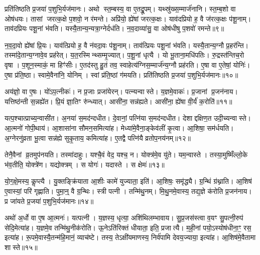 प्रति॑तिष्ठति प्र॒जया॑ प॒शुभि॒र्यज॑मानः।
अथो स्त॒म्बस्य॒ वा ए॒तद्रू॒पम्।
यथ्स्रु॑ख्स॒म्मार्ज॑नानि।
स्त॒म्ब॒शो वा ओष॑धयः।
तासां जरत्क॒क्षे प॒शवो॒ न र॑मन्ते।
अप्रि॑यो॒ ह्ये॑षां जरत्क॒क्षः।
याव॑दप्रियो ह॒ वै ज॑रत्क॒क्षः प॑शू॒नाम्।
ताव॑दप्रियः पशू॒नां भ॑वति।
यस्यै॒तान्य॒न्यत्रा॒ग्नेर्दध॑ति।
न॒व॒दाव्या॑सु॒ वा ओष॑धीषु प॒शवो॑ रमन्ते॥९॥

न॒व॒दा॒वो ह्ये॑षां प्रि॒यः।
याव॑त्प्रियो ह॒ वै न॑वदा॒वः प॑शू॒नाम्।
ताव॑त्प्रियः पशू॒नां भ॑वति।
यस्यै॒तान्य॒ग्नौ प्र॒हर॑न्ति।
तस्मा॑दे॒तान्य॒ग्नावे॒व प्रह॑रेत्।
य॒त॒रस्मिन्थ्सम्मृ॒ज्यात्।
प॒शू॒नां धृत्यै।
यो भू॒ताना॒मधि॑पतिः।
रु॒द्रस्त॑न्तिच॒रो वृषा।
प॒शून॒स्माकं॒ मा हिꣳ॑सीः।
ए॒तद॑स्तु हु॒तं तव॒ स्वाहेत्य॑ग्निस॒म्मार्ज॑न्य॒ग्नौ प्रह॑रति।
ए॒षा वा ए॒तेषां॒ योनिः॑।
ए॒षा प्र॑ति॒ष्ठा।
स्वामे॒वैना॑नि॒ योनिम्।
स्वां प्र॑ति॒ष्ठां ग॑मयति।
प्रति॑तिष्ठति प्र॒जया॑ प॒शुभि॒र्यज॑मानः॥१०॥

अय॑ज्ञो॒ वा ए॒षः।
यो॑ऽप॒त्नीकः॑।
न प्र॒जाः प्रजा॑येरन्।
पत्न्यन्वास्ते।
य॒ज्ञमे॒वाकः॑।
प्र॒जानां प्र॒जन॑नाय।
यत्तिष्ठ॑न्ती स॒न्नह्ये॑त।
प्रि॒यं ज्ञा॒तिꣳ रु॑न्ध्यात्।
आसी॑ना॒ सन्न॑ह्यते।
आसी॑ना॒ ह्ये॑षा वी॒र्य॑॑ क॒रोति॑॥११॥

यत्प॒श्चात्प्राच्य॒न्वासी॑त।
अ॒नया॑ स॒मद॑न्दधीत।
दे॒वानां॒ पत्नि॑या स॒मद॑न्दधीत।
देशाद्दक्षिण॒त उदी॒च्यन्वास्ते।
आ॒त्मनो॑ गोपी॒थाय॑।
आ॒शासा॑ना सौमन॒समित्या॑ह।
मेध्या॑मे॒वैना॒ङ्केव॑लीं कृ॒त्वा।
आ॒शिषा॒ सम॑र्धयति।
अ॒ग्नेरनु॑व्रता भू॒त्वा सन्न॑ह्ये सुकृ॒ताय॒ कमित्या॑ह।
ए॒तद्वै पत्नि॑यै व्रतोप॒नय॑नम्॥१२॥

तेनै॒वैनां व्र॒तमुप॑नयति।
तस्मा॑दाहुः।
यश्चै॒वं वेद॒ यश्च॒ न।
योक्त्र॑मे॒व यु॑ते।
यम॒न्वास्ते।
तस्या॒मुष्मिँल्लो॒के भ॑व॒तीति॒ योक्त्रे॑ण।
यद्योक्त्रम्।
स योगः॑।
यदास्ते।
स क्षेमः॑॥१३॥

यो॒ग॒क्षे॒मस्य॒ कॢप्त्यै।
यु॒क्तङ्क्रि॑याता आ॒शीः कामे॑ युज्याता॒ इति॑।
आ॒शिषः॒ समृ॑द्ध्यै।
ग्र॒न्थिं ग्र॑थ्नाति।
आ॒शिष॑ ए॒वास्यां॒ परि॑ गृह्णाति।
पुमा॒न्॒ वै ग्र॒न्थिः।
स्त्री पत्नी।
तन्मि॑थु॒नम्।
मि॒थु॒नमे॒वास्य॒ तद्य॒ज्ञे क॑रोति प्र॒जन॑नाय।
प्र जा॑यते प्र॒जया॑ प॒शुभि॒र्यज॑मानः॥१४॥

अथो॑ अ॒र्धो वा ए॒ष आ॒त्मनः॑।
यत्पत्नी।
य॒ज्ञस्य॒ धृत्या॒ अशि॑थिलम्भावाय।
सु॒प्र॒जस॑स्त्वा व॒यꣳ सु॒पत्नी॒रुप॑ सेदि॒मेत्या॑ह।
य॒ज्ञमे॒व तन्मि॑थु॒नीक॑रोति।
ऊ॒नेऽति॑रिक्तं धीयाता॒ इति॒ प्रजात्यै।
म॒ही॒नां पयो॒\-ऽस्योष॑धीना॒ꣳ॒ रस॒ इत्या॑ह।
रू॒पमे॒वास्यै॒तन्म॑हि॒मानं॒ व्याच॑ष्टे।
तस्य॒ तेऽक्षी॑यमाणस्य॒ निर्व॑पामि देवय॒ज्याया॒ इत्या॑ह।
आ॒शिष॑मे॒वैतामा शास्ते॥१५॥\anuvakamend[क॒रोति॑ व्रतोप॒नय॑नं॒ क्षेमो॒ यज॑मानः शास्ते]

